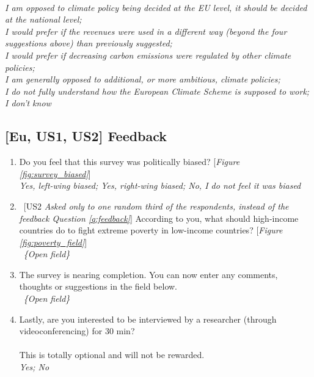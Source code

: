 \begin{enumerate}[resume]
    \\ \textit{I am opposed to climate policy being decided at the EU level, it should be decided at the national level; \\I would prefer if the revenues were used in a different way (beyond the four suggestions above) than previously suggested; \\I would prefer if decreasing carbon emissions were regulated by other climate policies; \\I am generally opposed to additional, or more ambitious, climate policies; \\I do not fully understand how the European Climate Scheme is supposed to work; \\I don't know}
\end{enumerate}

\subsection*{[Eu, US1, US2] Feedback}
\begin{enumerate}[resume]
\item \label{q:survey_biased} Do you feel that this survey was politically biased? [\textit{Figure \ref{fig:survey_biased}}]
\\ \textit{Yes, left-wing biased; Yes, right-wing biased; No, I do not feel it was biased}
\item \label{q:poverty_field} ~[US2 \textit{Asked only to one random third of the respondents, instead of the feedback Question \ref{q:feedback}}] According to you, what should high-income countries do to fight extreme poverty in low-income countries? [\textit{Figure \ref{fig:poverty_field}}]
\\ ~\textit{\{Open field\}}
\item \label{q:feedback} The survey is nearing completion. You can now enter any comments, thoughts or suggestions in the field below.
\\ ~\textit{\{Open field\}}
\item Lastly, are you interested to be interviewed by a researcher (through videoconferencing) for 30 min? \\
\\
This is totally optional and will not be rewarded.
\\ \textit{Yes; No}
\end{enumerate}

